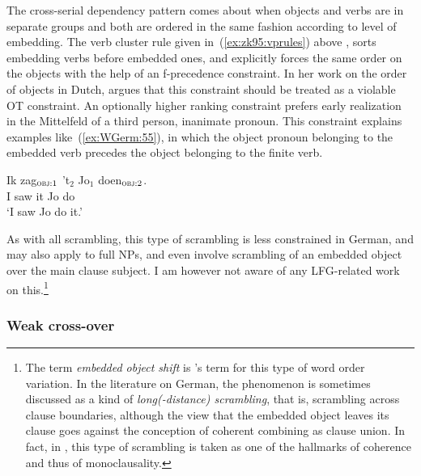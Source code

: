 \documentclass[output=paper,hidelinks]{langscibook}
\begin{document}
The cross-serial dependency pattern comes about
when objects and verbs are in separate groups and both are ordered in
the same fashion according to level of embedding. The verb cluster
rule given in~(\ref{ex:zk95:vprules}) above \citep{zaenen-kaplan1995},
sorts embedding verbs before embedded ones, and explicitly forces the
same order on the objects with the help of an f-precedence
constraint. In her work on the order of objects in Dutch,
 argues that this constraint should be
treated as a violable OT constraint. An optionally higher ranking constraint prefers early realization
in the Mittelfeld of a third person, inanimate pronoun. This constraint
explains examples like~(\ref{ex:WGerm:55}), in which the object pronoun
belonging to the embedded verb precedes the object belonging to the
finite verb.
%
\begin{exe}
  \ex\label{ex:WGerm:55} \gll Ik zag$_{\text{\textsc{obj}{}:1}}$ 't$_2$ Jo$_1$ doen$_{\text{\textsc{obj}{}:2}}$.\\
  I saw it Jo do\\
  \glt `I saw Jo do it.'
\end{exe}
%
As with all scrambling, this type of scrambling is less constrained in
German, and may also apply to full NPs, and even involve scrambling of
an embedded object over the main clause subject. I am however not aware of
any LFG-related work on this.\footnote{The term \textit{embedded
  object shift} is \citeauthor{vanderbeek:2005}'s term for this type
of word order variation. In the literature on German, the phenomenon
is sometimes discussed as a kind of \textit{long(-distance)
  scrambling}, that is, scrambling across clause boundaries, although
the view that the embedded object leaves its clause goes against the
conception of coherent combining as clause union. In fact, in
\citet{lee-schoenfeld:2007:benjamins}, this type of scrambling is
taken as one of the hallmarks of coherence and thus of monoclausality.}
 

\subsubsection{Weak cross-over\label{sec:Germanic:weakxover}}
\end{document}
